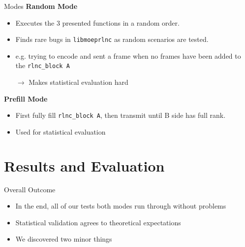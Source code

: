 \documentclass[t]{beamer} %
\begin{document}
\begin{frame}{Modes}
	\textbf{Random Mode}
	\begin{itemize}
		\item Executes the 3 presented functions in a random order.
		\item Finds rare bugs in \texttt{libmoeprlnc} as random scenarios are tested.
		\item e.g. trying to encode and sent a frame when no frames have been added to the \texttt{rlnc\_block A}
		      \pause
		\item[$\rightarrow$] Makes statistical evaluation hard
	\end{itemize}
	\pause
	\textbf{Prefill Mode}
	\begin{itemize}
		\item First fully fill \texttt{rlnc\_block A}, then transmit until B side has full rank.
		\item Used for statistical evaluation
	\end{itemize}
\end{frame}

\section{Results and Evaluation}

\begin{frame}{Overall Outcome}
	\begin{itemize}
		\item In the end, all of our tests both modes run through without problems
		\item Statistical validation agrees to theoretical expectations
		\item We discovered two minor things
	\end{itemize}
\end{frame}
\end{document}
